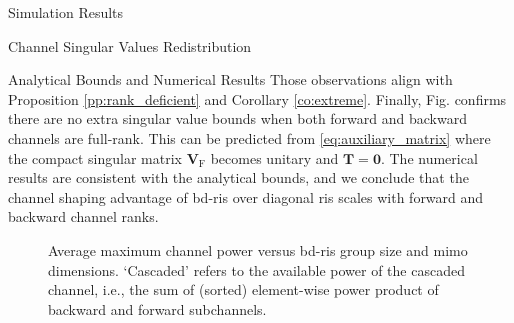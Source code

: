 \documentclass[journal]{IEEEtran}
\begin{document}
\begin{section}{Simulation Results}
\begin{subsection}{Channel Singular Values Redistribution}
\begin{subsubsection}{Analytical Bounds and Numerical Results}
			Those observations align with Proposition \ref{pp:rank_deficient} and Corollary \ref{co:extreme}.
			Finally, Fig.  confirms there are no extra singular value bounds when both forward and backward channels are full-rank.
			This can be predicted from \eqref{eq:auxiliary_matrix} where the compact singular matrix $\mathbf{V}_\mathrm{F}$ becomes unitary and $\mathbf{T}=\mathbf{0}$.
			The numerical results are consistent with the analytical bounds, and we conclude that the channel shaping advantage of \gls{bd}-\gls{ris} over diagonal \gls{ris} scales with forward and backward channel ranks.

			\begin{figure}[!t]
				\centering
				\caption{
					Average maximum channel power versus \gls{bd}-\gls{ris} group size and \gls{mimo} dimensions.
					`Cascaded' refers to the available power of the cascaded channel, i.e., the sum of (sorted) element-wise power product of backward and forward subchannels.
				}
				\label{fg:power_bond}
			\end{figure}


\end{subsubsection}
\end{subsection}
\end{section}
\end{document}
